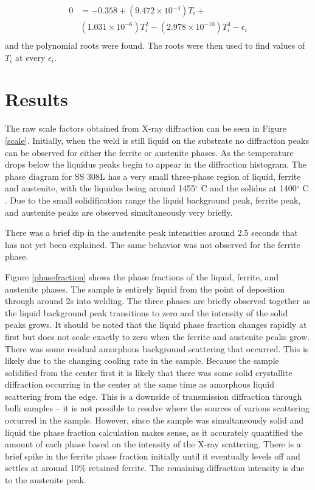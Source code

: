 \documentclass[twocolumn,nofootinbib,notitlepage,aps]{revtex4-1}
\begin{document}
\begin{equation}
\begin{split}
	0 & = -0.358 + (9.472\times10^{-4})T_i + \\
	& (1.031\times10^{-6})T_i^2 - (2.978\times10^{-10})T_i^3 - \epsilon_i\\
	\label{zeros}
	\end{split}
\end{equation}
and the polynomial roots were found. The roots were then used to find values of $T_i$ at every $\epsilon_i$. 




\section{Results}
The raw scale factors obtained from X-ray diffraction can be seen in Figure \ref{scale}. Initially, when the weld is still liquid on the substrate no diffraction peaks can be observed for either the ferrite or austenite phases. As the temperature drops below the liquidus peaks begin to appear in the diffraction histogram. The phase diagram for SS 308L has a very small three-phase region of liquid, ferrite and austenite, with the liquidus being around 1455$^\circ$ C and the solidus at 1400$^\circ$ C \cite{matweb}. Due to the small solidification range the liquid background peak, ferrite peak, and austenite peaks are observed simultaneously very briefly.

There was a brief dip in the austenite peak intensities around 2.5 seconds that has not yet been explained. The same behavior was not observed for the ferrite phase.

Figure \ref{phasefraction} shows the phase fractions of the liquid, ferrite, and austenite phases. The sample is entirely liquid from the point of deposition through around 2s into welding. The three phases are briefly observed together as the liquid background peak transitions to zero and the intensity of the solid peaks grows. It should be noted that the liquid phase fraction changes rapidly at first but does not scale exactly to zero when the ferrite and austenite peaks grow. There was some residual amorphous background scattering that occurred. This is likely due to the changing cooling rate in the sample. Because the sample solidified from the center first it is likely that there was some solid crystallite diffraction occurring in the center at the same time as amorphous liquid scattering from the edge. This is a downside of transmission diffraction through bulk samples -- it is not possible to resolve where the sources of various scattering occurred in the sample. However, since the sample was simultaneously solid and liquid the phase fraction calculation makes sense, as it accurately quantified the amount of each phase based on the intensity of the X-ray scattering. There is a brief spike in the ferrite phase fraction initially until it eventually levels off and settles at around 10\% retained ferrite. The remaining diffraction intensity is due to the austenite peak. 
\end{document}
